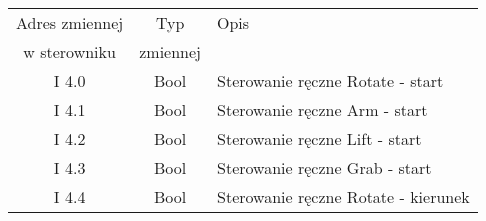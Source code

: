 \begin{table}[!htb]
\begin{center}
\begin{comment}
Rotate Stop Sensor  &    I       5.0 &  Bool   &   Krańcówka wyłączająca dany silnik.                                              \\\hline
Rotate Counter      &    I       5.1 &  Bool   &   Krańcówka licznika impulsów \\ & & & dla obracania.                                      \\\hline
Arm Stop Engine Sensor & I       5.2 &  Bool  &    Krańcówka wyłączająca dany silnik.                                              \\\hline
Arm Engine Counter  &    I       5.3 &  Bool  &    Krańcówka licznika impulsów \\ & & & dla ramienia.                                       \\\hline
Lift Stop Sensor     &   I       5.4 &  Bool   &   Krańcówka wyłączająca dany silnik.                                              \\\hline
Lift Counter        &    I       5.5 &  Bool   &   Krańcówka licznika impulsów \\ & & & dla podnośnika.                                     \\\hline
Grab Sensor         &    I       5.6 &  Bool   &   Krańcówka wyłączająca dany silnik.                                              \\\hline
Grab Counter        &    I       5.7 &  Bool   &   Krańcówka licznika impulsów \\ & & & dla chwytaka.                                       \\\hline
\end{tabular}
\end{comment}
\begin{tabular}{|c|c| p{10cm} |}\hline
Adres zmiennej & Typ  & Opis \\
w sterowniku &  zmiennej &   \\\hline
I       4.0 & Bool  &    Sterowanie ręczne Rotate - start   \\\hline                                            
I       4.1 &  Bool   &   Sterowanie ręczne Arm - start      \\\hline                                            
I       4.2 &  Bool   &   Sterowanie ręczne Lift - start             \\\hline                                    
I       4.3 &  Bool   &   Sterowanie ręczne Grab - start             \\\hline                                    
I       4.4 &  Bool   &   Sterowanie ręczne Rotate - kierunek        \\\hline                                    

\end{tabular}
\end{center}
\end{table}
